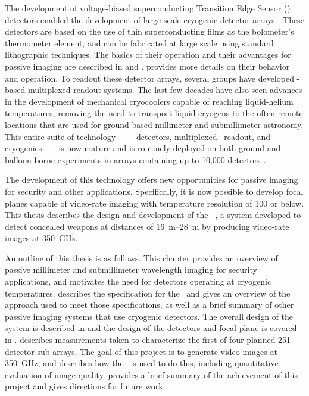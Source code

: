 The development of voltage-biased superconducting Transition Edge Sensor (\TES) detectors enabled the development of large-scale cryogenic detector arrays \cite{irwin_application_1995}.
These detectors are based on the use of thin superconducting films as the bolometer's thermometer element, and can be fabricated at large scale using standard lithographic techniques.
The basics of their operation and their advantages for passive imaging are described in  and .
 provides more details on their behavior and operation.
To readout these detector arrays, several groups have developed \SQUID-based multiplexed readout systems.
The last few decades have also seen advances in the development of mechanical cryocoolers capable of reaching liquid-helium temperatures, removing the need to transport liquid cryogens to the often remote locations that are used for ground-based millimeter and submillimeter astronomy.
This entire suite of technology~---~\TES\ detectors, multiplexed \SQUID\ readout, and cryogenics~---~is now mature and is routinely deployed on both ground and balloon-borne experiments in arrays containing up to 10,000 detectors \cite{holland_scuba-2:_2013}.

The development of this technology offers new opportunities for passive imaging for security and other applications.
Specifically, it is now possible to develop focal planes capable of video-rate imaging with temperature resolution of \SI{100}{\mK} or below.
This thesis describes the design and development of the \NIST\ \Imager, a system developed to detect concealed weapons at distances of \SIrange{16}{28}{\m} by producing video-rate images at \SI{350}{\GHz}.

An outline of this thesis is as follows.
This chapter provides an overview of passive millimeter and submillimeter wavelength imaging for security applications, and motivates the need for detectors operating at cryogenic temperatures.
 describes the specification for the \Imager\ and gives an overview of the approach used to meet those specifications, as well as a brief summary of other passive imaging systems that use cryogenic detectors.
The overall design of the system is described in  and the design of the detectors and focal plane is covered in .
 describes measurements taken to characterize the first of four planned 251-detector sub-arrays.
The goal of this project is to generate video images at \SI{350}{\GHz}, and  describes how the \Imager\ is used to do this, including quantitative evaluation of image quality.
 provides a brief summary of the achievement of this project and gives directions for future work.

